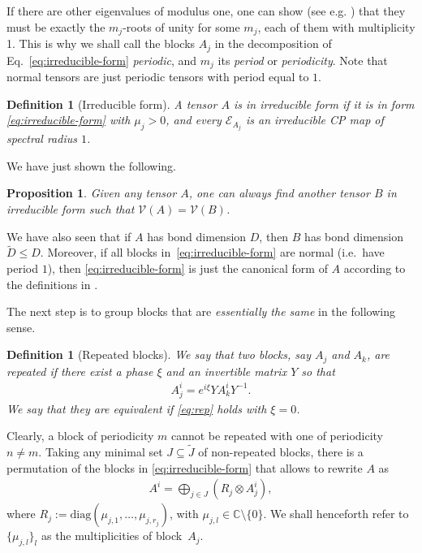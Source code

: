 \documentclass[pra,a4paper,notitlepage,nofootinbib,superscriptaddress]{revtex4-1}
\theoremstyle{plain}
\newtheorem{proposition}[lemma]{Proposition}
\newtheorem{definition}[lemma]{Definition}
\newcommand{\E}{\mathcal{E}}
\newcommand{\1}{{\openone}}
\newcommand{\be}{\begin{eqnarray}}
\newcommand{\ee}{\end{eqnarray}}
\newcommand{\mc}{\mathcal}
\newcommand{\diag}{\mathrm{diag}}
\begin{document}
If there are other eigenvalues of modulus one, one can show (see e.g. \cite{Wo11}) that they must be exactly the $m_j$-roots of unity for some $m_j$, each of them with multiplicity 1.
This is why we shall call the blocks $A_j$ in the decomposition of Eq.~\eqref{eq:irreducible-form} {\it periodic}, and $m_j$ its \emph{period} or \emph{periodicity}. Note that normal tensors are just periodic tensors with period equal to $1$.

\begin{definition}[Irreducible form]
    A tensor $A$ is in irreducible form if it is in form \eqref{eq:irreducible-form} with $\mu_j>0$, and every $\E_{A_j}$ is an irreducible CP map of  spectral radius $1$.
\end{definition}

We have just shown the following.

\begin{proposition}\label{thm:irr}
    Given any tensor $A$,
    one can always find another tensor $B$ in irreducible form such that $\mc{V}(A) = \mc{V}(B)$.
\end{proposition}

We have also seen that if $A$ has bond dimension $D$, then $B$ has bond dimension $\tilde{D}\leq D$. Moreover, if all blocks in~\eqref{eq:irreducible-form} are normal \cite{Ci15} (i.e.\ have period $1$), then \eqref{eq:irreducible-form} is just the canonical form of $A$ according to the definitions in \cite{Ci15}.


The next step is to group blocks that are {\it essentially the same} in the following sense.

\begin{definition}[Repeated  blocks] \label{def:repeated}
    We say that two blocks, say $A_j$ and $A_k$,
    are \emph{repeated} if there exist a phase $\xi$ and an invertible matrix  $Y$ so that
    \be
        A_j^i=e^{i\xi}YA_k^iY^{-1} .
        \label{eq:rep}
    \ee
    We say that they are \emph{equivalent} if \eqref{eq:rep} holds with $\xi=0$.
\end{definition}

Clearly, a block of periodicity $m$ cannot be repeated with one of
periodicity $n\ne m$. Taking any minimal set $J\subseteq \tilde{J}$ of
non-repeated blocks, there is a permutation of the blocks in
\eqref{eq:irreducible-form} that allows to rewrite $A$ as
\be
    A^i =
    \bigoplus_{j\in J}
    \left( R_j \otimes A^i_j\right) ,
    \label{eq:bdnr}
\ee
where $R_j:= \diag(\mu_{j,1},\ldots, \mu_{j,r_j})$, with $\mu_{j,l}\in
    \mathbb{C}\setminus\{0\}$. We shall henceforth refer to $\{\mu_{j,l}\}_{l}$ as the
multiplicities of block~$A_j$.
\end{document}
